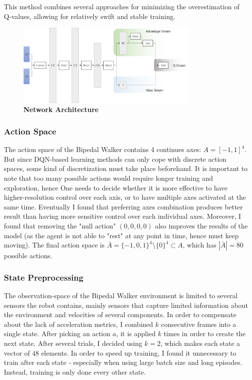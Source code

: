 \documentclass{article}
\begin{document}
\begin{multicols}{2}
This method combines several approaches for minimizing the overestimation of Q-values, allowing for relatively swift and stable training.

\begin{figure}
\begin{center}


\includegraphics[width=0.8\textwidth]{network}
\caption{\label{fig:network}
\textbf{Network Architecture}
}
\end{center}
\end{figure}

\subsubsection{Action Space}
The action space of the Bipedal Walker contains 4 continues axes: $A=[-1,1]^4$. But since DQN-based learning methods can only cope with discrete action spaces, some kind of discretization must take place beforehand. It is important to note that too many possible actions would require longer training and exploration, hence One needs to decide whether it is more effective to have higher-resolution control over each axis, or to have multiple axes activated at the same time. Eventually I found that preferring axes combination produces better result than having more sensitive control over each individual axes. Moreover, I found that removing the "null action" $(0,0,0,0)$ also improves the results of the model (as the agent is not able to "rest" at any point in time, hence must keep moving).
The final action space is $\bar{A}=\{-1,0,1\}^4 \setminus \{0\}^4 \subset A$, which has $|\bar{A}|=80$ possible actions.

\subsubsection{State Preprocessing}
The observation-space of the Bipedal Walker environment is limited to several sensors the robot contains, mainly sensors that capture limited information about the environment and velocities of several components. In order to compensate about the lack of acceleration metrics, I combined $k$ consecutive frames into a single state. After picking an action $a$, it is applied $k$ times in order to create the next state. After several trials, I decided using $k=2$, which makes each state a vector of $48$ elements. 
In order to speed up training, I found it unnecessary to train after each state - especially when using large batch size and long episodes. Instead, training is only done every other state.


\end{multicols}
\end{document}
